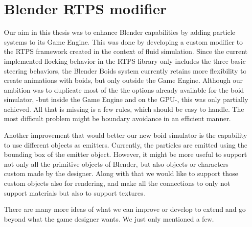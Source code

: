\section{Blender RTPS modifier}
Our aim in this thesis was to enhance Blender capabilities by adding particle systems to its Game Engine. This was done by developing a custom modifier to the RTPS framework created in the context of fluid simulation. Since the current implemented flocking behavior in the RTPS library only includes the three basic steering behaviors, the Blender Boids system currently retains more flexibility to create animations with boids, but only outside the Game Engine.  Although our ambition was to duplicate most of the the options already available for the boid simulator, -but inside the Game Engine and on the GPU-, this was only partially achieved. All that is missing is a few rules, which should be easy to handle. The most difficult problem might be boundary avoidance in an efficient manner. 

Another improvement that would better our new boid simulator is the capability to use different objects as emitters. Currently, the particles are emitted using the bounding box of the emitter object. However, it might be more useful to support not only all the primitive objects of Blender, but also objects or characters custom made by the designer. Along with that we would like to support those custom objects also for rendering, and make all the connections to only not support materials but also to support textures.

There are many more ideas of what we can improve or develop to extend and go beyond what the game designer wants. We just only mentioned a few.

